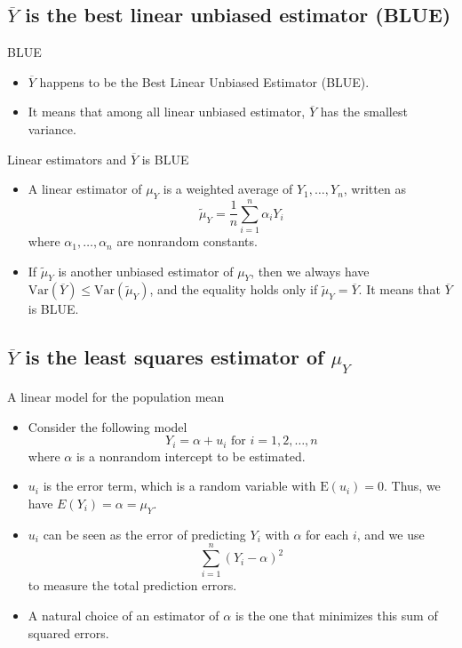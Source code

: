 \documentclass[presentation]{beamer}
\begin{document}
\subsection*{\(\overline{Y}\) is the best linear unbiased estimator (BLUE)}
\label{sec:org58466c3}

\begin{frame}[label={sec:org6f6a6c5}]{BLUE}
\begin{itemize}
\item \(\overline{Y}\) happens to be the \alert{Best Linear Unbiased Estimator
(BLUE)}.

\item It means that among all linear unbiased estimator,
\(\overline{Y}\) has the smallest variance.
\end{itemize}
\end{frame}

\begin{frame}[label={sec:orgd0079d4}]{Linear estimators and \(\overline{Y}\) is BLUE}
\begin{itemize}
\item A linear estimator of \(\mu_Y\) is a weighted average of \(Y_1, \ldots,
  Y_n\), written as
\[ \tilde{\mu}_Y = \frac{1}{n} \sum_{i=1}^n \alpha_i Y_i \]
where \(\alpha_1, \ldots, \alpha_n\) are nonrandom constants.

\item If \(\tilde{\mu}_Y\) is another unbiased estimator of \(\mu_Y\),
then we always have \(\mathrm{Var}(\overline{Y}) \leq
  \mathrm{Var}(\tilde{\mu}_Y)\), and the equality holds only if
\(\tilde{\mu}_Y = \overline{Y}\). It means that \(\overline{Y}\) is BLUE.
\end{itemize}
\end{frame}

\subsection*{\(\overline{Y}\) is the least squares estimator of \(\mu_Y\)}
\label{sec:org09cc3db}

\begin{frame}[label={sec:org3ab671d}]{A linear model for the population mean}
\begin{itemize}
\item Consider the following model
\[ Y_i = \alpha + u_i \text{ for } i = 1, 2, \ldots, n \]
where \(\alpha\) is a nonrandom intercept to be estimated.

\item \(u_i\) is the error term, which is a random variable with
\(\mathrm{E}(u_i) = 0\).  Thus, we have \(E(Y_i) = \alpha = \mu_Y\).

\item \(u_i\) can be seen as the error of predicting \(Y_i\) with \(\alpha\) for
each \(i\), and we use 
\[\sum_{i=1}^n (Y_i - \alpha)^2\] 
to measure the total prediction errors.

\item A natural choice of an estimator of \(\alpha\) is the one that
minimizes this sum of squared errors.
\end{itemize}
\end{frame}
\end{document}
